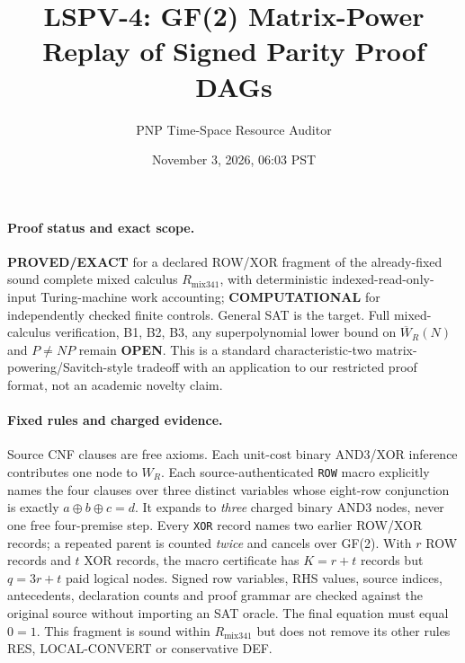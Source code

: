 \documentclass[11pt]{article}
\title{LSPV-4: GF(2) Matrix-Power Replay of Signed Parity Proof DAGs}
\author{PNP Time-Space Resource Auditor}
\date{November 3, 2026, 06:03 PST}
\begin{document}
\maketitle

\paragraph{Proof status and exact scope.}
\textbf{PROVED/EXACT} for a declared ROW/XOR fragment of the already-fixed sound complete mixed calculus $R_{\mathrm{mix341}}$, with deterministic indexed-read-only-input Turing-machine work accounting; \textbf{COMPUTATIONAL} for independently checked finite controls. General SAT is the target. Full mixed-calculus verification, B1, B2, B3, any superpolynomial lower bound on $\overline W_R(N)$ and $P\ne NP$ remain \textbf{OPEN}. This is a standard characteristic-two matrix-powering/Savitch-style tradeoff with an application to our restricted proof format, not an academic novelty claim.

\paragraph{Fixed rules and charged evidence.}
Source CNF clauses are free axioms. Each unit-cost binary AND3/XOR inference contributes one node to $W_R$. Each source-authenticated \texttt{ROW} macro explicitly names the four clauses over three distinct variables whose eight-row conjunction is exactly $a\oplus b\oplus c=d$. It expands to \emph{three} charged binary AND3 nodes, never one free four-premise step. Every \texttt{XOR} record names two earlier ROW/XOR records; a repeated parent is counted \emph{twice} and cancels over GF(2). With $r$ ROW records and $t$ XOR records, the macro certificate has $K=r+t$ records but $q=3r+t$ paid logical nodes. Signed row variables, RHS values, source indices, antecedents, declaration counts and proof grammar are checked against the original source without importing an SAT oracle. The final equation must equal $0=1$. This fragment is sound within $R_{\mathrm{mix341}}$ but does not remove its other rules RES, LOCAL-CONVERT or conservative DEF.
\end{document}
